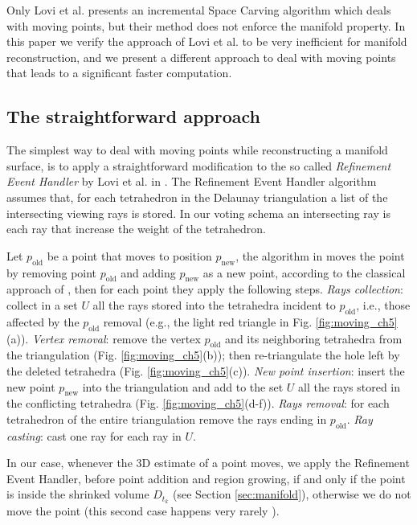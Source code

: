 Only Lovi et al. \cite{Lovi_et_al_11} presents an incremental Space Carving algorithm which deals with moving points, but their method does not enforce the manifold property.
In this paper we verify the approach of Lovi et al. \cite{Lovi_et_al_11} to be very inefficient for manifold reconstruction, and we present a different approach to deal with moving points that leads to a significant faster computation.


\subsection{The straightforward approach}
\label{subsec:straightforward_way}
The simplest way to deal with moving points while reconstructing a manifold surface, is to apply a straightforward modification to the so called \emph{Refinement Event Handler} by Lovi et al. in \cite{Lovi_et_al_11}.
The Refinement Event Handler algorithm assumes that, for each tetrahedron in the Delaunay triangulation a list of the intersecting viewing rays is stored. In our voting schema an intersecting ray is each ray that increase the weight of the tetrahedron. 

Let $p_{\text{old}}$ be a point that moves to position $p_{\text{new}}$, the algorithm in \cite{Lovi_et_al_11} moves the point by removing point $p_{\text{old}}$ and adding $p_{\text{new}}$ as a new point, according to the classical approach of \cite{Devillers03}, then for each point they apply the following steps. \emph{Rays collection}: collect in a set $U$ all the rays stored into the tetrahedra incident to $p_{\text{old}}$, i.e., those affected by the $p_{\text{old}}$ removal (e.g., the light red triangle in Fig. \ref{fig:moving_ch5}(a)). \emph{Vertex removal}: remove the vertex $p_{\text{old}}$ and its neighboring tetrahedra from the triangulation (Fig. \ref{fig:moving_ch5}(b)); then re-triangulate the hole left by the deleted tetrahedra (Fig. \ref{fig:moving_ch5}(c)). \emph{New point insertion}: insert the new point $p_{\text{new}}$ into the triangulation and add to the set $U$ all the rays stored in the conflicting tetrahedra (Fig. \ref{fig:moving_ch5}(d-f)). \emph{Rays removal}: for each tetrahedron of the entire triangulation remove the rays ending in $p_{\text{old}}$. \emph{Ray casting}: cast one ray for each ray in $U$.

In our case, whenever the 3D estimate of a point moves, we apply the Refinement Event Handler, before point addition and region growing, if and only if the point is inside the shrinked volume $D_{t_k}$ (see Section \ref{sec:manifold}), otherwise we do not move the point (this second case happens very rarely \cite{litvinov_lhuillier_13}).
